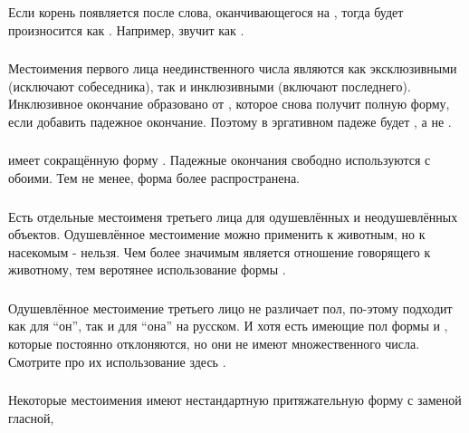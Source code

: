 Если корень  появляется после слова, оканчивающегося на , тогда  будет произносится как . Например,  звучит как .

\subsubsection{} Местоимения первого лица неединственного числа являются как эксклюзивными (исключают собеседника), так и инклюзивными (включают последнего). Инклюзивное окончание  образовано от , которое снова получит полную форму, если добавить падежное окончание.
Поэтому  в эргативном падеже будет , а не .

\subsubsection{}  имеет сокращённую форму .
Падежные окончания свободно используются с обоими. Тем не менее, форма  более распространена.

\subsubsection{} Есть отдельные местоименя третьего лица для одушевлённых и неодушевлённых объектов. Одушевлённое местоимение  можно применить к животным, но к насекомым - нельзя. Чем более значимым является отношение говорящего к животному, тем веротянее использование формы .

\subsubsection{} Одушевлённое местоимение третьего лицо  не различает пол, по-этому подходит как для ``он'', так и для ``она'' на русском.  И хотя есть имеющие пол формы   и 
, которые постоянно отклоняются, но они не имеют множественного числа.  Смотрите про их использование здесь  .
\label{morph:pron:gender}

\subsubsection{} \label{morph:pron:irreg-gen}
Некоторые местоимения имеют нестандартную притяжательную форму с заменой гласной,

